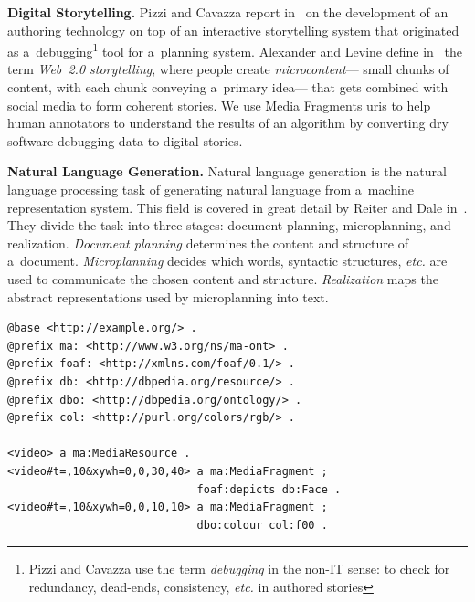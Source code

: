 \documentclass{article}
\begin{document}
\noindent \textbf{Digital Storytelling.} Pizzi and Cavazza report in~\cite{pizzi2008debugging} on the development of an authoring technology on top of an interactive storytelling system that originated as a~debugging\footnote{Pizzi and Cavazza use the term \emph{debugging} in the non-IT sense: to check for redundancy, dead-ends, consistency, \emph{etc.} in authored stories} tool for a~planning system. Alexander and Levine define in~\cite{alexander2008storytelling}
the term \emph{Web~2.0 storytelling}, where people create \emph{microcontent}---%
small chunks of content, with each chunk conveying a~primary idea---%
that gets combined with social media to form coherent stories. We use Media Fragments {\sc uri}s to help human annotators to understand the results of an algorithm by converting dry software debugging data to digital stories.

\noindent \textbf{Natural Language Generation.} Natural language generation is the natural language processing task of generating natural language from a~machine representation system. This field is covered in great detail by Reiter and Dale in~\cite{reiter2000building}. They divide the task into three stages: document planning, microplanning, and realization. \emph{Document planning} determines the content and structure of a~document. \emph{Microplanning} decides which words, syntactic structures, \emph{etc.} are used to communicate the chosen content and structure. \emph{Realization} maps the abstract representations
used by microplanning into text.

\begin{lstlisting}[caption={Description of two 10~sec long media fragments:
  \textit{(i)}~a~tile of dimensions $ 30 \times 40 $ pixels
  starting at pixel coordinates $ (0, 0) $
  that contains a~face; and
  \textit{(ii)}~a~tile of dimensions $ 10 \times 10 $ pixels
  starting at pixel coordinates $ (0, 0) $ of red color},
  label=code:media-fragment, float=b!]
@base <http://example.org/> .
@prefix ma: <http://www.w3.org/ns/ma-ont> .
@prefix foaf: <http://xmlns.com/foaf/0.1/> .
@prefix db: <http://dbpedia.org/resource/> .
@prefix dbo: <http://dbpedia.org/ontology/> .
@prefix col: <http://purl.org/colors/rgb/> .

<video> a ma:MediaResource .
<video#t=,10&xywh=0,0,30,40> a ma:MediaFragment ;
                             foaf:depicts db:Face .
<video#t=,10&xywh=0,0,10,10> a ma:MediaFragment ;
                             dbo:colour col:f00 .
\end{lstlisting}
\end{document}
